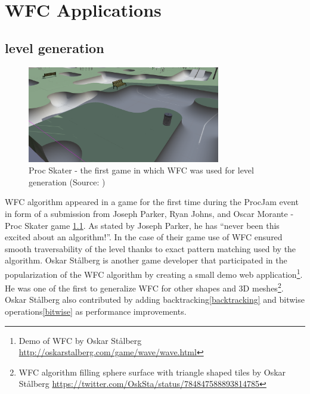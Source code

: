 \documentclass[shortabstract, english, inz]{iithesis}
\begin{document}
\chapter{WFC Applications}
\label{chapter2}
\section{level generation}
\begin{figure}[H]
\centering
\includegraphics[width=0.75\textwidth, angle=0]{images/skater.png}
\caption{Proc Skater - the first game in which WFC was used for level generation (Source: \cite{skater})}
\label{fig:skater}
\end{figure}
WFC algorithm appeared in a game for the first time during the ProcJam event in form of a submission from Joseph Parker, Ryan Johns, and Oscar Morante - Proc Skater game \ref{fig:skater}. As stated by Joseph Parker, he has “never been this excited about an algorithm!”. In the case of their game use of WFC ensured smooth traversability of the level thanks to exact pattern matching used by the algorithm.\break
 Oskar Stålberg is another game developer that participated in the popularization of the WFC algorithm by creating a small demo web application\footnote{Demo of WFC by  Oskar Stålberg \url{http://oskarstalberg.com/game/wave/wave.html}}. He was one of the first to generalize WFC for other shapes and 3D meshes\footnote{WFC algorithm filling sphere surface with triangle shaped tiles by Oskar Stålberg \url{https://twitter.com/OskSta/status/784847588893814785}}. Oskar Stålberg also contributed by adding backtracking\ref{backtracking} and bitwise operations\ref{bitwise} as performance improvements.\cite{Smith}
\end{document}
